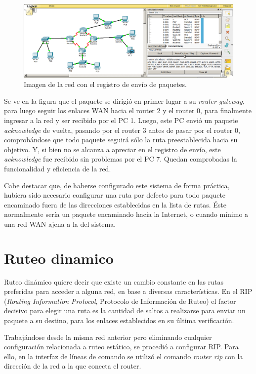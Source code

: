 \documentclass[spanish]{udpreport}
\begin{document}
\begin{figure}[H]
	\begin{center}
		\includegraphics[width= 17cm]{Imagenes/envio_estatico}
		\caption{Imagen de la red con el registro de envío de paquetes.}
	\end{center}
\end{figure}

Se ve en la figura que el paquete se dirigió en primer lugar a su \textit{router gateway}, para luego seguir los enlaces WAN hacia el router 2 y el router 0, para finalmente ingresar a la red y ser recibido por el PC 1. Luego, este PC envió un paquete \textit{acknowledge} de vuelta, pasando por el router 3 antes de pasar por el router 0, comprobándose que todo paquete seguirá sólo la ruta preestablecida hacia su objetivo. Y, si bien no se alcanza a apreciar en el registro de envío, este \textit{acknowledge} fue recibido sin problemas por el PC 7. Quedan comprobadas la funcionalidad y eficiencia de la red.

Cabe destacar que, de haberse configurado este sistema de forma práctica, hubiera sido necesario configurar una ruta por defecto para todo paquete encaminado fuera de las direcciones establecidas en la lista de rutas. Éste normalmente sería un paquete encaminado hacia la Internet, o cuando mínimo a una red WAN ajena a la del sistema.

\chapter{Ruteo dinamico}

Ruteo dinámico quiere decir que existe un cambio constante en las rutas preferidas para acceder a alguna red, en base a diversas características. En el RIP (\textit{Routing Information Protocol}, Protocolo de Información de Ruteo) el factor decisivo para elegir una ruta es la cantidad de saltos a realizarse para enviar un paquete a su destino, para los enlaces establecidos en su última verificación.

Trabajándose desde la misma red anterior pero eliminando cualquier configuración relacionada a ruteo estático, se procedió a configurar RIP. Para ello, en la interfaz de líneas de comando se utilizó el comando \textit{router rip} con la dirección de la red a la que conecta el router.
\end{document}
